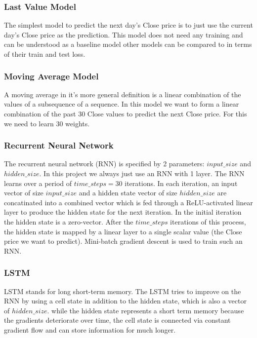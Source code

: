 \documentclass[utf8x]{ctexart}
\begin{document}
\subsubsection{Last Value Model}

The simplest model to predict the next day's Close price is to just use the current day's Close price as the prediction. This model does not need any training and can be understood as a baseline model other models can be compared to in terms of their train and test loss.

\subsubsection{Moving Average Model}

A moving average in it's more general definition is a linear combination of the values of a subsequence of a sequence. In this model we want to form a linear combination of the past 30 Close values to predict the next Close price. For this we need to learn 30 weights.

\subsubsection{Recurrent Neural Network}

The recurrent neural network (RNN) is specified by 2 parameters: $input\_size$ and $hidden\_size$. In this project we always just use an RNN with 1 layer. The RNN learns over a period of $time\_steps = 30$ iterations. In each iteration, an input vector of size $input\_size$ and a hidden state vector of size $hidden\_size$ are concatinated into a combined vector which is fed through a ReLU-activated linear layer to produce the hidden state for the next iteration. In the initial iteration the hidden state is a zero-vector. After the $time\_steps$ iterations of this process, the hidden state is mapped by a linear layer to a single scalar value (the Close price we want to predict).
Mini-batch gradient descent is used to train such an RNN.

\subsubsection{LSTM}

LSTM stands for long short-term memory. The LSTM tries to improve on the RNN by using a cell state in addition to the hidden state, which is also a vector of $hidden\_size$. while the hidden state represents a short term memory because the gradients deteriorate over time, the cell state is connected via constant gradient flow and can store information for much longer.
\end{document}
